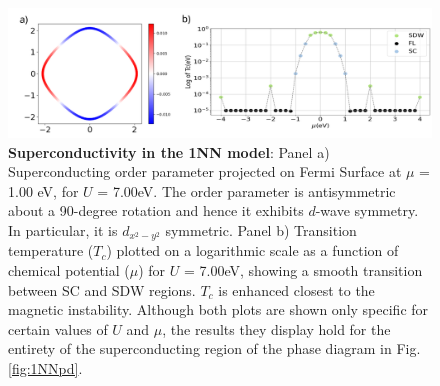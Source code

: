 \documentclass[11pt]{article}
\begin{document}
\begin{figure}[htbp]  %
    \centering
    \includegraphics[width=1.0\textwidth]{1NNSC.png}  %
    \caption{\textbf{Superconductivity in the 1NN model}:  
    Panel a) Superconducting order parameter projected on Fermi Surface at $\mu$ = 1.00 eV, 
    for $U$ = 7.00eV. The order parameter is antisymmetric about a 90-degree rotation and hence
    it exhibits $d$-wave symmetry. In particular, it is $d_{x^2-y^2}$ symmetric. 
    Panel b) Transition temperature ($T_c$) plotted on a logarithmic scale as a function of chemical potential ($\mu$) for $U$ = 7.00eV, showing
    a smooth transition between SC and SDW regions.
    $T_c$ is enhanced closest to the magnetic instability. 
    Although both plots are shown only specific for certain values of $U$ and $\mu$, the results they display hold for the entirety of
    the superconducting region of the phase diagram in Fig.\ref{fig:1NNpd}.  
    }
    \label{fig:1NNSC}
\end{figure}
\end{document}
